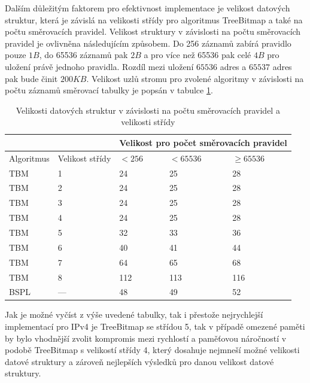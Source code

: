 Dalším důležitým faktorem pro efektivnost implementace je velikost datových struktur, která je
závislá na velikosti střídy pro algoritmus TreeBitmap a také na počtu směrovacích pravidel.
Velikost struktury v závislosti na počtu směrovacích pravidel je ovlivněna následujícím způsobem.
Do 256 záznamů zabírá pravidlo pouze $1B$, do 65536 záznamů pak $2B$ a pro více než 65536 pak celé $4B$ pro uložení právě jednoho pravidla. Rozdíl mezi uložení $65536$ adres a $65537$ adres pak bude činit
$200KB$. Velikost uzlů stromu pro zvolené algoritmy v závislosti na počtu záznamů směrovací tabulky
je popsán v tabulce \ref{tab:lpm-input}.

\begin{table}[!htbp]
	\center
    \begin{tabular}{|l|l|l|l|l|}
    \hline
    & & \multicolumn{3}{l|}{Velikost pro počet směrovacích pravidel} \\ \hline
    Algoritmus & Velikost střídy & $< 256$ & $< 65536$ & $\geq 65536$\\ \hhline{|=|=|=|=|=|}
    TBM & 1 & 24 & 25 & 28 \\ \hline
    TBM & 2 & 24 & 25 & 28\\ \hline
    TBM & 3 & 24 & 25 & 28\\ \hline
    TBM & 4 & 24 & 25 & 28\\ \hline
    TBM & 5 & 32 & 33 & 36\\ \hline
    TBM & 6 & 40 & 41 & 44\\ \hline
    TBM & 7 & 64 & 65 & 68\\ \hline
    TBM & 8 & 112 & 113 & 116\\ \hline
    BSPL & --- & 48 & 49 & 52\\ \hline
    \end{tabular}
	\caption{Velikosti datových struktur v závislosti na počtu směrovacích pravidel a velikosti střídy}
    \label{tab:lpm-input}
\end{table}

Jak je možné vyčíst z výše uvedené tabulky, tak i přestože nejrychlejší implementací pro IPv4 je TreeBitmap se střídou 5, tak v případě omezené paměti by bylo vhodnější zvolit kompromis mezi rychlostí a paměťovou náročností v podobě
TreeBitmap s velikostí střídy 4, který dosahuje nejmneší možné velikosti datové struktury a zároveň nejlepších výsledků pro danou velikost datové struktury.

